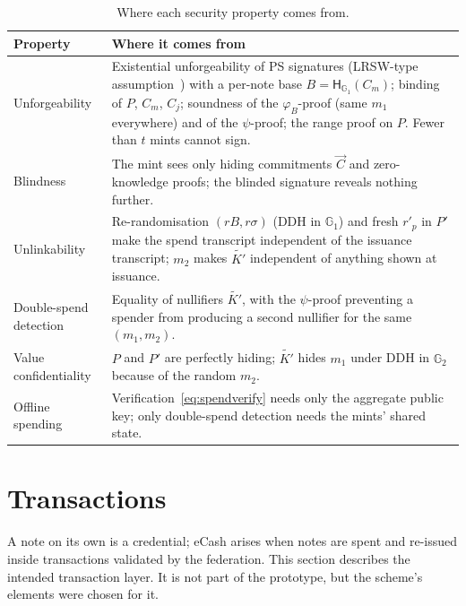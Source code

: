 \documentclass[10pt,a5paper]{article}
\newcommand{\tabsize}{\small}\newcommand{\legendsize}{\footnotesize}
\newcommand{\tabsize}{}\newcommand{\legendsize}{\small}
\newcommand{\K}[1]{#1}                      %
\newcommand{\Go}[1]{#1}                     %
\newcommand{\Gt}[1]{\tilde{#1}}             %
\newcommand{\K}[1]{{\color{ScalarCol}#1}}   %
\newcommand{\Go}[1]{{\color{GoneCol}#1}}    %
\newcommand{\Gt}[1]{{\color{GtwoCol}#1}}    %
\newcommand{\GG}[1]{\mathbb{G}_{#1}}
\newcommand{\Hg}{\mathsf{H}_{\GG{1}}}
\newcommand{\vv}[1]{\vec{#1}}
\begin{document}
\begin{table}[htbp]
\caption{Where each security property comes from.}
\label{tab:props}

\begin{center}
\tabsize
\begin{tabular}{@{}lp{\wSec}@{}}
\toprule
Property & Where it comes from \\
\midrule
Unforgeability & Existential unforgeability of PS signatures (LRSW-type assumption~\cite{ps16}) with a per-note base $\Go{B} = \Hg(\Go{C_m})$; binding of $\Go{P}$, $\Go{C_m}$, $\Go{C_j}$; soundness of the $\varphi_{\Go{B}}$-proof (same $\K{m_1}$ everywhere) and of the $\psi$-proof; the range proof on $\Go{P}$. Fewer than $t$ mints cannot sign. \\
Blindness & The mint sees only hiding commitments $\vv{C}$ and zero-knowledge proofs; the blinded signature reveals nothing further. \\
Unlinkability & Re-randomisation $(\K{r}\Go{B},\K{r}\Go{\sigma})$ (DDH in $\GG{1}$) and fresh $\K{r'_p}$ in $\Go{P'}$ make the spend transcript independent of the issuance transcript; $\K{m_2}$ makes $\Gt{K'}$ independent of anything shown at issuance. \\
Double-spend detection & Equality of nullifiers $\Gt{K'}$, with the $\psi$-proof preventing a spender from producing a second nullifier for the same $(\K{m_1},\K{m_2})$. \\
Value confidentiality & $\Go{P}$ and $\Go{P'}$ are perfectly hiding; $\Gt{K'}$ hides $\K{m_1}$ under DDH in $\GG{2}$ because of the random $\K{m_2}$. \\
Offline spending & Verification~\eqref{eq:spendverify} needs only the aggregate public key; only double-spend detection needs the mints' shared state. \\
\bottomrule
\end{tabular}
\end{center}
\end{table}

\section{Transactions}
\label{sec:tx}

A note on its own is a credential; eCash arises when notes are spent and
re-issued inside transactions validated by the federation. This section
describes the intended transaction layer. It is not part of the prototype, but
the scheme's elements were chosen for it.
\end{document}
